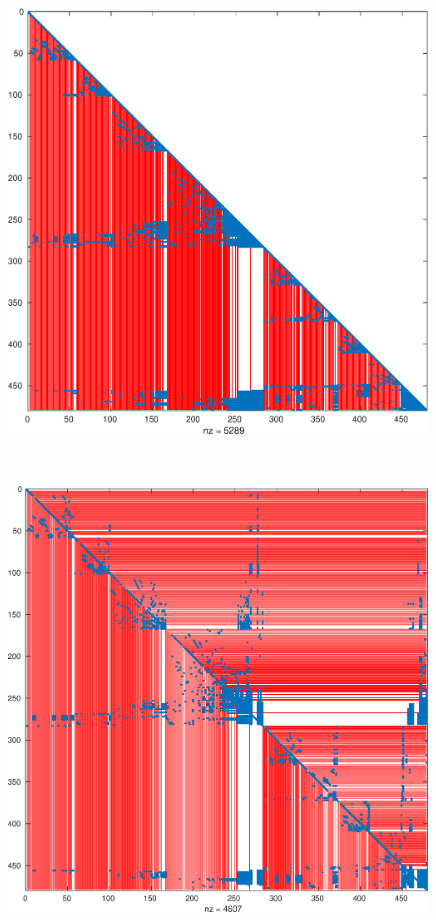 \begin{figure}
\begin{minipage}{.48\textwidth}
 \begin{center}
\includegraphics[width=0.99\textwidth]{figures/west0479-match-metis-chol-super} 
 \end{center}
\end{minipage}
~
\begin{minipage}{.48\textwidth}
  \begin{center}
\includegraphics[width=0.99\textwidth]{figures/west0479-match-metis-lu-super} 

\end{center}
\end{minipage}
\end{figure}
